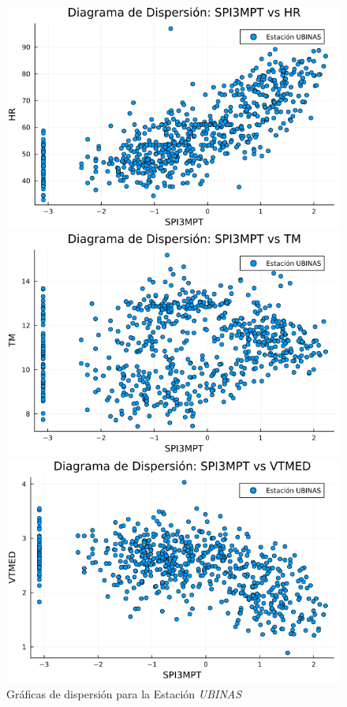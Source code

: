 \begin{figure}[htbp]
\centering
\caption{Gráficas de dispersión para la Estación \textit{UBINAS}}
\begin{minipage}{0.32\textwidth}
    \centering
    \includegraphics[width=\linewidth]{Capitulos/Scaterplot/UBINAS_SPI3MPT_vs_HR.png}
\end{minipage}\hfill
\begin{minipage}{0.32\textwidth}
    \centering
    \includegraphics[width=\linewidth]{Capitulos/Scaterplot/UBINAS_SPI3MPT_vs_TM.png}
\end{minipage}\hfill
\begin{minipage}{0.32\textwidth}
    \centering
    \includegraphics[width=\linewidth]{Capitulos/Scaterplot/UBINAS_SPI3MPT_vs_VTMED.png}

\end{minipage}
\end{figure}
